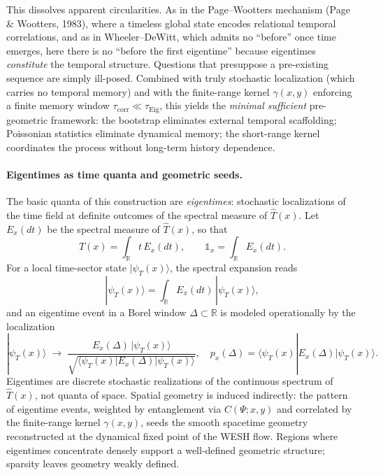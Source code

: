 \documentclass[12pt,a4paper]{article}
\numberwithin{equation}{section}
\begin{document}
This dissolves apparent circularities. As in the Page--Wootters mechanism (Page \& Wootters, 1983), where a timeless global state encodes relational temporal correlations, and as in Wheeler--DeWitt, which admits no ``before'' once time emerges, here there is no ``before the first eigentime'' because eigentimes \emph{constitute} the temporal structure. Questions that presuppose a pre-existing sequence are simply ill-posed. Combined with truly stochastic localization (which carries no temporal memory) and with the finite-range kernel $\gamma(x,y)$ enforcing a finite memory window $\tau_{\mathrm{corr}}\ll\tau_{\mathrm{Eig}}$, this yields the \emph{minimal sufficient} pre-geometric framework: the bootstrap eliminates external temporal scaffolding; Poissonian statistics eliminate dynamical memory; the short-range kernel coordinates the process without long-term history dependence.

\paragraph{Eigentimes as time quanta and geometric seeds.}
The basic quanta of this construction are \emph{eigentimes}: stochastic localizations of the time field at definite outcomes of the spectral measure of $\hat T(x)$. Let $E_x(dt)$ be the spectral measure of $\hat T(x)$, so that
\begin{equation}
\hat T(x) = \int_{\mathbb R} t\,E_x(dt),
\qquad
\mathbb 1_x = \int_{\mathbb R} E_x(dt).
\end{equation}
For a local time-sector state $|\psi_T(x)\rangle$, the spectral expansion reads
\begin{equation}
|\psi_T(x)\rangle = \int_{\mathbb R} E_x(dt)\,|\psi_T(x)\rangle,
\end{equation}
and an eigentime event in a Borel window $\Delta\subset\mathbb R$ is modeled operationally by the localization
\begin{equation}
|\psi_T(x)\rangle \;\longrightarrow\;
\frac{E_x(\Delta)\,|\psi_T(x)\rangle}
{\sqrt{\langle\psi_T(x)|E_x(\Delta)|\psi_T(x)\rangle}},
\quad
p_x(\Delta)=\langle\psi_T(x)|E_x(\Delta)|\psi_T(x)\rangle.
\label{eq:eigentime-collapse}
\end{equation}
Eigentimes are discrete stochastic realizations of the continuous spectrum of $\hat T(x)$, not quanta of space. Spatial geometry is induced indirectly: the pattern of eigentime events, weighted by entanglement via $C(\Psi;x,y)$ and correlated by the finite-range kernel $\gamma(x,y)$, seeds the smooth spacetime geometry reconstructed at the dynamical fixed point of the WESH flow. Regions where eigentimes concentrate densely support a well-defined geometric structure; sparsity leaves geometry weakly defined.
\end{document}
